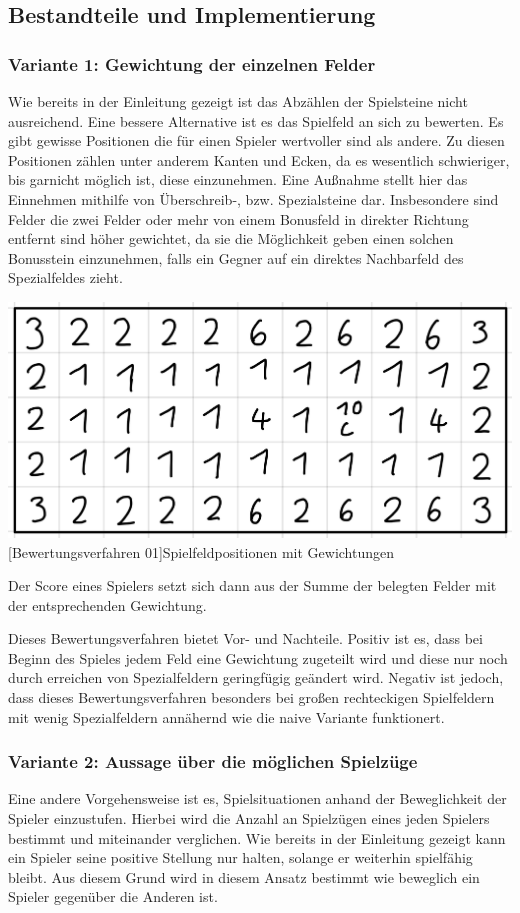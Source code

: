 \documentclass[12pt,a4paper,bibliography=totocnumbered,listof=totocnumbered]{article}
\begin{document}
\subsection{Bestandteile und Implementierung}\label{kap:Heuristik}
\subsubsection{Variante 1: Gewichtung der einzelnen Felder}
Wie bereits in der Einleitung gezeigt ist das Abzählen der Spielsteine nicht ausreichend. Eine bessere Alternative ist es das Spielfeld an sich zu bewerten. Es gibt gewisse Positionen die für einen Spieler wertvoller sind als andere. Zu diesen Positionen zählen unter anderem Kanten und Ecken, da es wesentlich schwieriger, bis garnicht möglich ist, diese einzunehmen. Eine Außnahme stellt hier das Einnehmen mithilfe von Überschreib-, bzw. Spezialsteine dar. Insbesondere sind Felder die zwei Felder oder mehr von einem Bonusfeld in direkter Richtung entfernt sind höher gewichtet, da sie die Möglichkeit geben einen solchen Bonusstein einzunehmen, falls ein Gegner auf ein direktes Nachbarfeld des Spezialfeldes zieht.

\vspace{1em}
\begin{minipage}{\linewidth}
	\centering
	\includegraphics[width=0.5\linewidth]{pics/bewertung.png}
	[Bewertungsverfahren 01]{Spielfeldpositionen mit Gewichtungen}
	\label{fig:bewertungsverfahren01}
\end{minipage}

Der Score eines Spielers setzt sich dann aus der Summe der belegten Felder mit der entsprechenden Gewichtung.

Dieses Bewertungsverfahren bietet Vor- und Nachteile. Positiv ist es, dass bei Beginn des Spieles jedem Feld eine Gewichtung zugeteilt wird und diese nur noch durch erreichen von Spezialfeldern geringfügig geändert wird. Negativ ist jedoch, dass dieses Bewertungsverfahren besonders bei großen rechteckigen Spielfeldern mit wenig Spezialfeldern annähernd wie die naive Variante funktionert.

\subsubsection{Variante 2: Aussage über die möglichen Spielzüge}
Eine andere Vorgehensweise ist es, Spielsituationen anhand der Beweglichkeit der Spieler einzustufen. Hierbei wird die Anzahl an Spielzügen eines jeden Spielers bestimmt und miteinander verglichen. Wie bereits in der Einleitung gezeigt kann ein Spieler seine positive Stellung nur halten, solange er weiterhin spielfähig bleibt. Aus diesem Grund wird in diesem Ansatz bestimmt wie beweglich ein Spieler gegenüber die Anderen ist.
\end{document}

